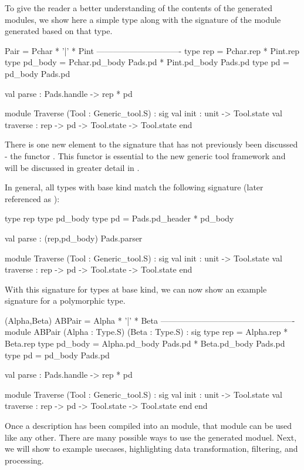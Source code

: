 To give the reader a better understanding of the contents of the
generated modules, we show here a simple \padsml{} type along with the
signature of the module generated based on that type.
\begin{code}
 Pair = Pchar * '|' * Pint
\mbox{}
-------------------------------
\mbox{}
type rep = Pchar.rep * Pint.rep
type pd_body = Pchar.pd_body Pads.pd * Pint.pd_body Pads.pd
type pd = pd_body Pads.pd

val parse : Pads.handle -> rep * pd

module Traverse (Tool : Generic_tool.S) :
  sig
    val init : unit -> Tool.state
    val traverse : rep -> pd -> Tool.state -> Tool.state
  end
\end{code}

There is one new element to the signature that has not previously been
discussed - the functor . This functor is essential to
the new generic tool framework and will be discussed in greater detail
in .

In general, all types with base kind match the following signature
(later referenced as ):
\begin{code}
type rep
type pd\_body
type pd = Pads.pd_header * pd_body

val parse : (rep,pd\_body) Pads.parser

module Traverse (Tool : Generic\_tool.S) :
sig
  val init : unit -> Tool.state
  val traverse : rep -> pd -> Tool.state -> Tool.state
end  
\end{code}

With this signature for types at base kind, we can now show an example
signature for a polymorphic type.
\begin{code}
 (Alpha,Beta) ABPair = Alpha * '|' * Beta
\mbox{}
-------------------------------------------------
\mbox{}
module ABPair (Alpha : Type.S) (Beta : Type.S) :
sig
  type rep = Alpha.rep * Beta.rep
  type pd\_body = Alpha.pd\_body Pads.pd * Beta.pd\_body Pads.pd
  type pd = pd\_body Pads.pd

  val parse : Pads.handle -> rep * pd

  module Traverse (Tool : Generic\_tool.S) :
    sig
      val init : unit -> Tool.state
      val traverse : rep -> pd -> Tool.state -> Tool.state
    end
end
\end{code}

Once a description has been compiled into an \ocaml{} module, that
module can be used like any other. There are many possible ways to use
the generated moduel. Next, we will show to example usecases,
highlighting data transformation, filtering, and processing.


